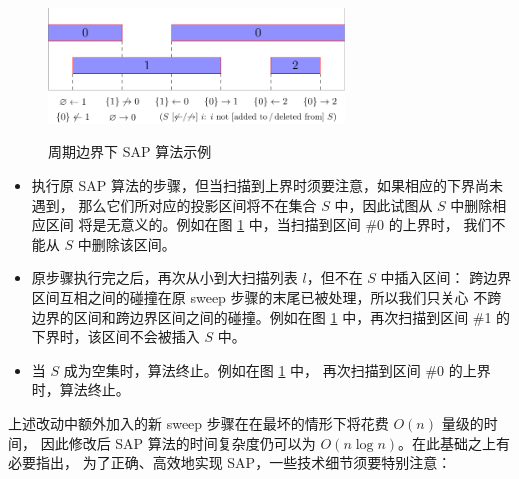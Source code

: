 \begin{figure}[htbp!]
\ffigbox%
	{\includegraphics[width = 0.7\textwidth]{img/sap-sweep-2}}%
	{\caption{周期边界下 SAP 算法示例}\label{fig:sap-sweep-2}}
\end{figure}

\begin{itemize}
\item 执行原 SAP 算法的步骤，但当扫描到上界时须要注意，如果相应的下界尚未遇到，
	那么它们所对应的投影区间将不在集合 $S$ 中，因此试图从 $S$ 中删除相应区间
	将是无意义的。例如在图 \ref{fig:sap-sweep-2} 中，当扫描到区间 \#0 的上界时，
	我们不能从 $S$ 中删除该区间。
\item 原步骤执行完之后，再次从小到大扫描列表 $l$，但不在 $S$ 中插入区间：
	跨边界区间互相之间的碰撞在原 sweep 步骤的末尾已被处理，所以我们只关心
	不跨边界的区间和跨边界区间之间的碰撞。例如在图 \ref{fig:sap-sweep-2}
	中，再次扫描到区间 \#1 的下界时，该区间不会被插入 $S$ 中。
\item 当 $S$ 成为空集时，算法终止。例如在图 \ref{fig:sap-sweep-2} 中，
	再次扫描到区间 \#0 的上界时，算法终止。
\end{itemize}

上述改动中额外加入的新 sweep 步骤在在最坏的情形下将花费 $O(n)$ 量级的时间，
因此修改后 SAP 算法的时间复杂度仍可以为 $O(n\log n)$。在此基础之上有必要指出，
为了正确、高效地实现 SAP，一些技术细节须要特别注意：

